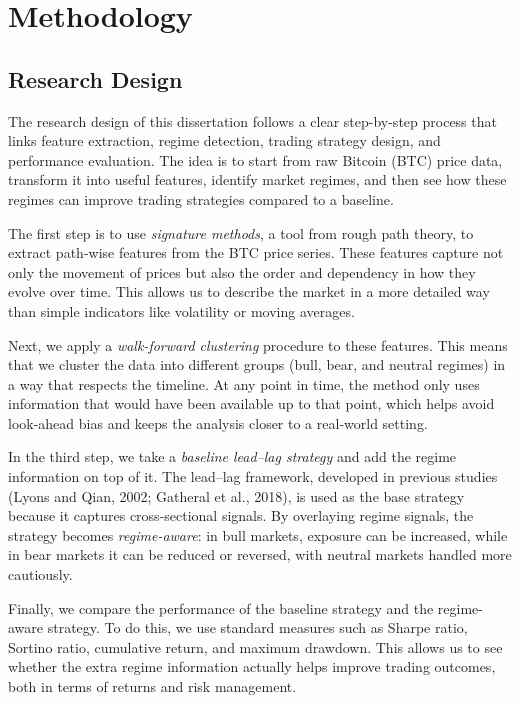 \chapter{Methodology}

\section{Research Design}

The research design of this dissertation follows a clear step-by-step process that links feature extraction, regime detection, trading strategy design, and performance evaluation. The idea is to start from raw Bitcoin (BTC) price data, transform it into useful features, identify market regimes, and then see how these regimes can improve trading strategies compared to a baseline. 

The first step is to use \textit{signature methods}, a tool from rough path theory, to extract path-wise features from the BTC price series. These features capture not only the movement of prices but also the order and dependency in how they evolve over time. This allows us to describe the market in a more detailed way than simple indicators like volatility or moving averages. 

Next, we apply a \textit{walk-forward clustering} procedure to these features. This means that we cluster the data into different groups (bull, bear, and neutral regimes) in a way that respects the timeline. At any point in time, the method only uses information that would have been available up to that point, which helps avoid look-ahead bias and keeps the analysis closer to a real-world setting. 

In the third step, we take a \textit{baseline lead--lag strategy} and add the regime information on top of it. The lead--lag framework, developed in previous studies (Lyons and Qian, 2002; Gatheral et al., 2018), is used as the base strategy because it captures cross-sectional signals. By overlaying regime signals, the strategy becomes \textit{regime-aware}: in bull markets, exposure can be increased, while in bear markets it can be reduced or reversed, with neutral markets handled more cautiously. 

Finally, we compare the performance of the baseline strategy and the regime-aware strategy. To do this, we use standard measures such as Sharpe ratio, Sortino ratio, cumulative return, and maximum drawdown. This allows us to see whether the extra regime information actually helps improve trading outcomes, both in terms of returns and risk management. 

